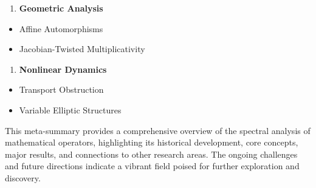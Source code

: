 \documentclass[11pt,a4paper]{article}
\begin{document}
\begin{enumerate}
\item \textbf{Geometric Analysis}
\end{enumerate}
\begin{itemize}
\item Affine Automorphisms
\item Jacobian-Twisted Multiplicativity
\end{itemize}

\begin{enumerate}
\item \textbf{Nonlinear Dynamics}
\end{enumerate}
\begin{itemize}
\item Transport Obstruction
\item Variable Elliptic Structures
\end{itemize}

This meta-summary provides a comprehensive overview of the spectral analysis of mathematical operators, highlighting its historical development, core concepts, major results, and connections to other research areas. The ongoing challenges and future directions indicate a vibrant field poised for further exploration and discovery.
\end{document}
